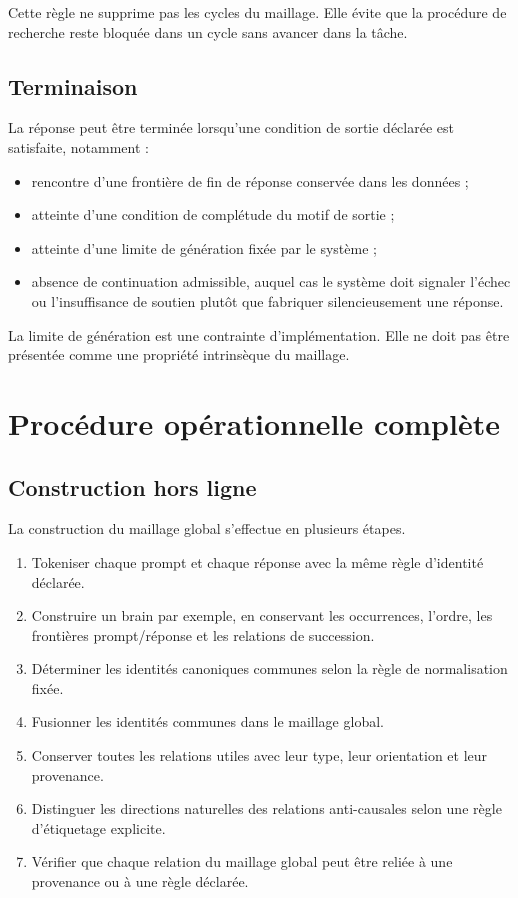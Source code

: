 \documentclass[11pt,a4paper]{report}
\theoremstyle{definition}
\theoremstyle{plain}
\theoremstyle{remark}
\begin{document}
Cette règle ne supprime pas les cycles du maillage. Elle évite
que la procédure de recherche reste bloquée dans un cycle sans
avancer dans la tâche.

\section{Terminaison}

La réponse peut être terminée lorsqu'une condition de sortie
déclarée est satisfaite, notamment :
\begin{itemize}
  \item rencontre d'une frontière de fin de réponse conservée
        dans les données ;
  \item atteinte d'une condition de complétude du motif de sortie ;
  \item atteinte d'une limite de génération fixée par le système ;
  \item absence de continuation admissible, auquel cas le système
        doit signaler l'échec ou l'insuffisance de soutien plutôt
        que fabriquer silencieusement une réponse.
\end{itemize}

La limite de génération est une contrainte d'implémentation.
Elle ne doit pas être présentée comme une propriété intrinsèque
du maillage.

\chapter{Procédure opérationnelle complète}

\section{Construction hors ligne}

La construction du maillage global s'effectue en plusieurs
étapes.

\begin{enumerate}[label=\arabic*.]
  \item Tokeniser chaque prompt et chaque réponse avec la même
        règle d'identité déclarée.
  \item Construire un brain par exemple, en conservant les
        occurrences, l'ordre, les frontières prompt/réponse et
        les relations de succession.
  \item Déterminer les identités canoniques communes selon la
        règle de normalisation fixée.
  \item Fusionner les identités communes dans le maillage global.
  \item Conserver toutes les relations utiles avec leur type,
        leur orientation et leur provenance.
  \item Distinguer les directions naturelles des relations
        anti-causales selon une règle d'étiquetage explicite.
  \item Vérifier que chaque relation du maillage global peut être
        reliée à une provenance ou à une règle déclarée.
\end{enumerate}
\end{document}
